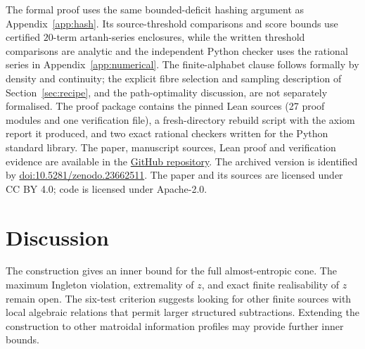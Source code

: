 The formal proof uses the same bounded-deficit hashing argument as
Appendix~\ref{app:hash}. Its source-threshold comparisons and score
bounds use certified $20$-term artanh-series enclosures, while the written
threshold comparisons are analytic and the independent Python checker
uses the rational series in Appendix~\ref{app:numerical}.
The finite-alphabet clause follows formally by density and continuity;
the explicit fibre selection and sampling description of
Section~\ref{sec:recipe}, and the path-optimality discussion, are not
separately formalised. The proof package contains the pinned Lean sources (27 proof modules and
one verification file), a fresh-directory rebuild script with the axiom
report it produced, and two exact rational checkers written for the
Python standard library. The paper, manuscript sources, Lean proof and
verification evidence are available in the
\href{https://github.com/SR123/conditional-parity-hashing}{GitHub repository}.
The archived version is identified by
\href{https://doi.org/10.5281/zenodo.23662511}{doi:10.5281/zenodo.23662511}.
The paper and its sources are licensed under CC BY 4.0; code is
licensed under Apache-2.0.

\section{Discussion}
The construction gives an inner bound for the full almost-entropic cone.
The maximum Ingleton violation, extremality of $z$, and exact finite
realisability of $z$ remain open. The six-test criterion suggests looking
for other finite sources with local algebraic relations that permit
larger structured subtractions. Extending the construction to other
matroidal information profiles may provide further inner bounds.
